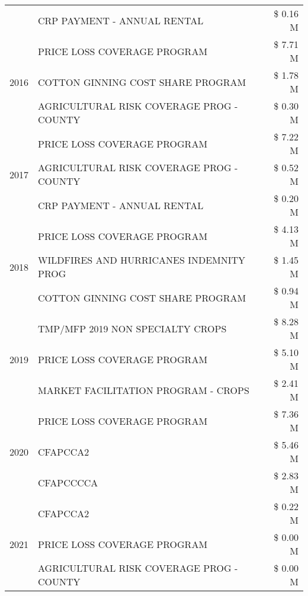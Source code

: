 \begin{tabular}{llr}
 & CRP PAYMENT - ANNUAL RENTAL & \$ 0.16 M \\
\cline{1-3}
\multirow[t]{3}{*}{2016} & PRICE LOSS COVERAGE PROGRAM                   & \$ 7.71 M \\
 & COTTON GINNING COST SHARE PROGRAM             & \$ 1.78 M \\
 & AGRICULTURAL RISK COVERAGE PROG - COUNTY      & \$ 0.30 M \\
\cline{1-3}
\multirow[t]{3}{*}{2017} & PRICE LOSS COVERAGE PROGRAM & \$ 7.22 M \\
 & AGRICULTURAL RISK COVERAGE PROG - COUNTY & \$ 0.52 M \\
 & CRP PAYMENT - ANNUAL RENTAL & \$ 0.20 M \\
\cline{1-3}
\multirow[t]{3}{*}{2018} & PRICE LOSS COVERAGE PROGRAM & \$ 4.13 M \\
 & WILDFIRES AND HURRICANES INDEMNITY PROG & \$ 1.45 M \\
 & COTTON GINNING COST SHARE PROGRAM & \$ 0.94 M \\
\cline{1-3}
\multirow[t]{3}{*}{2019} & TMP/MFP 2019 NON SPECIALTY CROPS & \$ 8.28 M \\
 & PRICE LOSS COVERAGE PROGRAM & \$ 5.10 M \\
 & MARKET FACILITATION PROGRAM - CROPS & \$ 2.41 M \\
\cline{1-3}
\multirow[t]{3}{*}{2020} & PRICE LOSS COVERAGE PROGRAM & \$ 7.36 M \\
 & CFAPCCA2 & \$ 5.46 M \\
 & CFAPCCCCA & \$ 2.83 M \\
\cline{1-3}
\multirow[t]{3}{*}{2021} & CFAPCCA2 & \$ 0.22 M \\
 & PRICE LOSS COVERAGE PROGRAM & \$ 0.00 M \\
 & AGRICULTURAL RISK COVERAGE PROG - COUNTY & \$ 0.00 M \\
\cline{1-3}
\bottomrule
\end{tabular}
